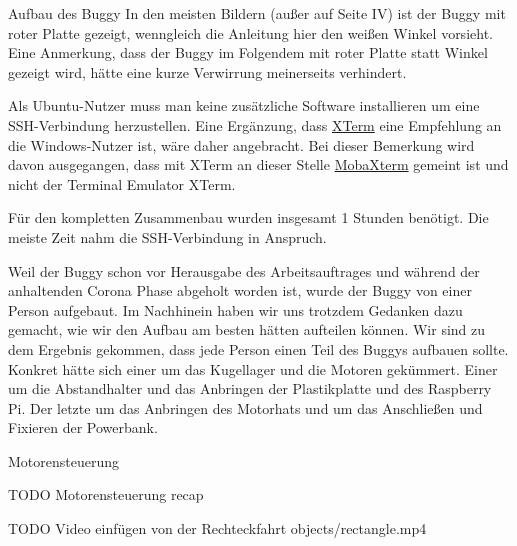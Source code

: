 \documentclass[12pt,twoside]{report}
\begin{document}
\begin{section}{Aufbau des Buggy}
In den meisten Bildern (außer auf Seite IV) ist der Buggy mit roter Platte gezeigt, wenngleich die Anleitung hier den weißen Winkel vorsieht. Eine Anmerkung, dass der Buggy im Folgendem mit roter Platte statt Winkel gezeigt wird, hätte eine kurze Verwirrung meinerseits verhindert.

Als Ubuntu-Nutzer muss man keine zusätzliche Software installieren um eine SSH-Verbindung herzustellen. Eine Ergänzung, dass \href{https://invisible-island.net/xterm/}{XTerm} eine Empfehlung an die Windows-Nutzer ist, wäre daher angebracht. Bei dieser Bemerkung wird davon ausgegangen, dass mit XTerm an dieser Stelle \href{https://mobaxterm.mobatek.net/}{MobaXterm} gemeint ist und nicht der Terminal Emulator XTerm. 

Für den kompletten Zusammenbau wurden insgesamt 1 Stunden benötigt. Die meiste Zeit nahm die SSH-Verbindung in Anspruch.

Weil der Buggy schon vor Herausgabe des Arbeitsauftrages und während der anhaltenden Corona Phase abgeholt worden ist, wurde der Buggy von einer Person aufgebaut. Im Nachhinein haben wir uns trotzdem Gedanken dazu gemacht, wie wir den Aufbau am besten hätten aufteilen können. Wir sind zu dem Ergebnis gekommen, dass jede Person einen Teil des Buggys aufbauen sollte. Konkret hätte sich einer um das Kugellager und die Motoren gekümmert. Einer um die Abstandhalter und das Anbringen der Plastikplatte und des Raspberry Pi. Der letzte um das Anbringen des Motorhats und um das Anschließen und Fixieren der Powerbank.

\end{section}

\begin{section}{Motorensteuerung}

    TODO Motorensteuerung recap

    TODO Video einfügen von der Rechteckfahrt objects/rectangle.mp4

\end{section}
\end{document}
